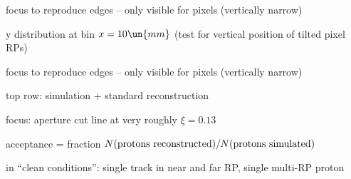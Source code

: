 \> focus to reproduce edges -- only visible for pixels (vertically narrow)

\centerline{}



\newpage %

\SmallerFonts

\> y distribution at bin $x = 10\un{mm}$ (test for vertical position of tilted pixel RPs)

\> focus to reproduce edges -- only visible for pixels (vertically narrow)

\centerline{}



\newpage %

\centerline{}



\newpage %

\SmallerFonts

\> top row: simulation + standard reconstruction

\> focus: aperture cut line at very roughly $\xi = 0.13$

\centerline{}


\newpage %

\> acceptance = fraction $N(\hbox{protons reconstructed}) / N(\hbox{protons simulated})$

\centerline{}



\newpage %

\SmallerFonts

\> in ``clean conditions'': single track in near and far RP, single multi-RP proton

